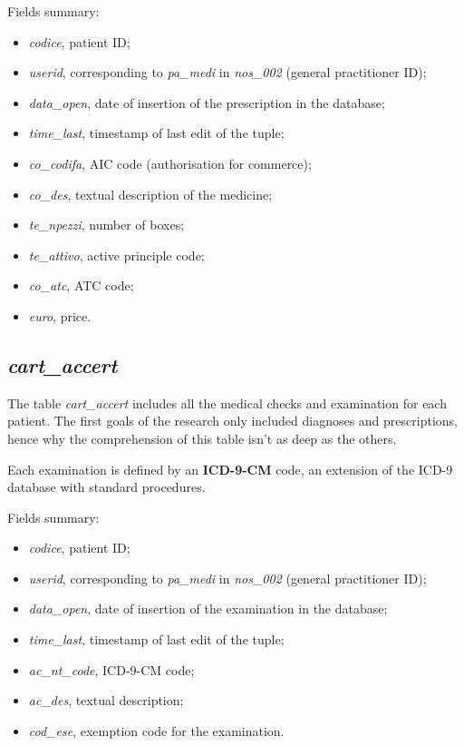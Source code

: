 Fields summary:
\begin{itemize}
	\item \textit{codice}, patient ID;
	\item \textit{userid}, corresponding to \textit{pa\_medi }in \textit{nos\_002} (general practitioner ID);
	\item \textit{data\_open}, date of insertion of the prescription in the database;
	\item \textit{time\_last}, timestamp of last edit of the tuple;
	\item \textit{co\_codifa}, AIC code (authorisation for commerce);
	\item \textit{co\_des}, textual description of the medicine;
	\item \textit{te\_npezzi}, number of boxes;
	\item \textit{te\_attivo}, active principle code;
	\item \textit{co\_atc}, ATC code;
	\item \textit{euro}, price.
\end{itemize}

\subsection{\textit{cart\_accert}}
The table \textit{cart\_accert} includes all the medical checks and examination for each patient. The first goals of the research only included diagnoses and prescriptions, hence why the comprehension of this table isn't as deep as the others.

Each examination is defined by an \textbf{ICD-9-CM} code, an extension of the ICD-9 database with standard procedures. 

Fields summary:
\begin{itemize}
	\item \textit{codice}, patient ID;
	\item \textit{userid}, corresponding to \textit{pa\_medi} in \textit{nos\_002} (general practitioner ID);
	\item \textit{data\_open}, date of insertion of the examination in the database;
	\item \textit{time\_last}, timestamp of last edit of the tuple;
	\item \textit{ac\_nt\_code}, ICD-9-CM code;
	\item \textit{ac\_des}, textual description;
	\item \textit{cod\_ese}, exemption code for the examination.
\end{itemize}

